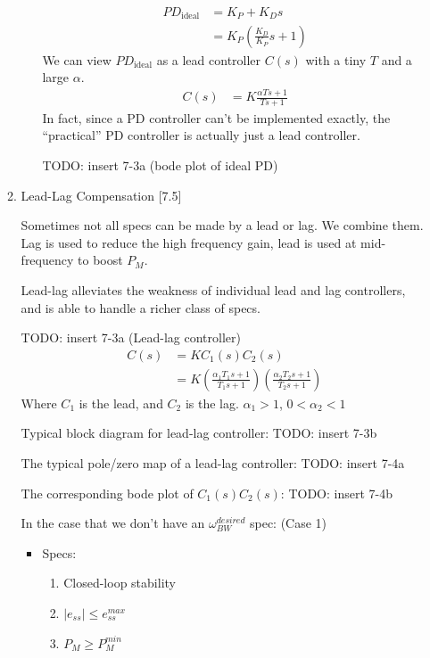 \begin{enumerate}
\begin{enumerate}
\begin{enumerate}
                        \begin{align*}
                            PD_{\text{ideal}} &= K_P + K_D s \\
                            &= K_P \left( \frac{K_D}{K_P} s + 1 \right)
                        \end{align*}
                        We can view $PD_{\text{ideal}}$ as a lead controller $C(s)$ with a tiny $T$ and a large $\alpha$.
                        \begin{align*}
                            C(s) &= K \frac{\alpha T s + 1}{T s + 1}
                        \end{align*}
                        In fact, since a PD controller can't be implemented exactly, the ``practical'' PD controller is actually just a lead controller.

                        TODO: insert 7-3a (bode plot of ideal PD)
                \end{enumerate}
            \item Lead-Lag Compensation [7.5]

                Sometimes not all specs can be made by a lead or lag.
                We combine them. Lag is used to reduce the high frequency gain, lead is used at mid-frequency to boost $P_M$.

                Lead-lag alleviates the weakness of individual lead and lag controllers, and is able to handle a richer class of specs.

                TODO: insert 7-3a (Lead-lag controller)
                \begin{align*}
                    C(s) &= K C_1(s) C_2(s) \\
                    &= K \left(\frac{\alpha_1 T_1 s + 1}{T_1 s + 1} \right) \left(\frac{\alpha_2 T_2 s + 1}{T_2 s + 1}\right)
                \end{align*}
                Where $C_1$ is the lead, and $C_2$ is the lag. $\alpha_1 > 1$, $0 < \alpha_2 < 1$

                Typical block diagram for lead-lag controller: TODO: insert 7-3b

                The typical pole/zero map of a lead-lag controller: TODO: insert 7-4a

                The corresponding bode plot of $C_1(s)C_2(s)$: TODO: insert 7-4b

                In the case that we don't have an $\omega_{BW}^{desired}$ spec: (Case 1)
                \begin{itemize}
                    \item Specs:
                        \begin{enumerate}
                            \item Closed-loop stability
                            \item $|e_{ss}| \le e_{ss}^{max}$
                            \item $P_M \ge P_M^{min}$
                        \end{enumerate}


\end{itemize}
\end{enumerate}
\end{enumerate}
